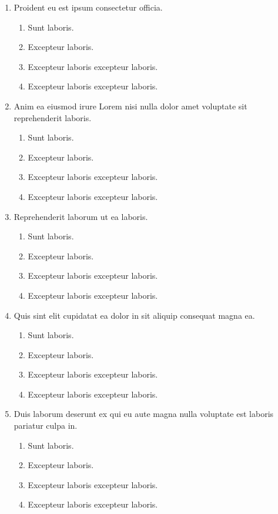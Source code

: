 \documentclass[a4paper,12pt]{article}
\begin{document}
\begin{enumerate}[label=\textbf{\arabic*.}]
  \item Proident eu est ipsum consectetur officia.
  \begin{enumerate}
    \item Sunt laboris.
    \item Excepteur laboris.
    \item Excepteur laboris excepteur laboris.
    \item Excepteur laboris excepteur laboris.
  \end{enumerate}
  \item Anim ea eiusmod irure Lorem nisi nulla dolor amet voluptate sit reprehenderit laboris.
  \begin{enumerate}
    \item Sunt laboris.
    \item Excepteur laboris.
    \item Excepteur laboris excepteur laboris.
    \item Excepteur laboris excepteur laboris.
  \end{enumerate}
  \item Reprehenderit laborum ut ea laboris.
  \begin{enumerate}
    \item Sunt laboris.
    \item Excepteur laboris.
    \item Excepteur laboris excepteur laboris.
    \item Excepteur laboris excepteur laboris.
  \end{enumerate}
  \item Quis sint elit cupidatat ea dolor in sit aliquip consequat magna ea.
  \begin{enumerate}
    \item Sunt laboris.
    \item Excepteur laboris.
    \item Excepteur laboris excepteur laboris.
    \item Excepteur laboris excepteur laboris.
  \end{enumerate}
  \item Duis laborum deserunt ex qui eu aute magna nulla voluptate est laboris pariatur culpa in.
  \begin{enumerate}
    \item Sunt laboris.
    \item Excepteur laboris.
    \item Excepteur laboris excepteur laboris.
    \item Excepteur laboris excepteur laboris.

\end{enumerate}
\end{enumerate}
\end{document}
